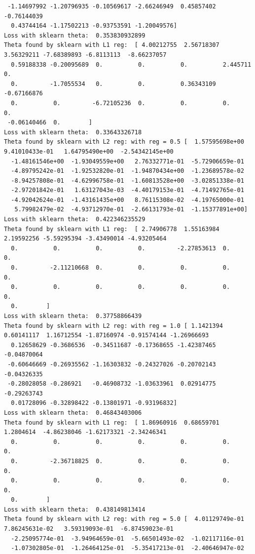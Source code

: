 \documentclass{article}
\begin{document}
\begin{tiny}
\begin{lstlisting}
 -1.14697992 -1.20796935 -0.10569617 -2.66246949  0.45857402 -0.76144039
  0.43744164 -1.17502213 -0.93753591 -1.20049576]
Loss with sklearn theta:  0.353830932899
Theta found by sklearn with L1 reg:  [ 4.00212755  2.56718307  3.56329211 -7.68389893 -6.8113113  -8.66237057
  0.59188338 -0.20095689  0.          0.          0.          2.445711    0.
  0.         -1.7055534   0.          0.          0.36343109 -0.67166876
  0.          0.         -6.72105236  0.          0.          0.          0.
 -0.06140466  0.        ]
Loss with sklearn theta:  0.33643326718
Theta found by sklearn with L2 reg: with reg = 0.5 [  1.57595698e+00   9.41010433e-01   1.64795490e+00  -2.54342145e+00
  -1.48161546e+00  -1.93049559e+00   2.76332771e-01  -5.72906659e-01
  -4.89795242e-01  -1.92532820e-01  -1.94870434e+00  -1.23689578e-02
  -8.94257808e-01  -4.62996758e-01  -1.60813528e+00  -3.02851338e-01
  -2.97201842e-01   1.63127043e-03  -4.40179153e-01  -4.71492765e-01
  -4.92042624e-01  -1.43161435e+00   8.76115308e-02  -4.19765000e-01
   5.79982479e-02  -4.93712970e-01  -2.66131793e-01  -1.15377891e+00]
Loss with sklearn theta:  0.422346235529
Theta found by sklearn with L1 reg:  [ 2.74906778  1.55163984  2.19592256 -5.59295394 -3.43490014 -4.93205464
  0.          0.          0.          0.         -2.27853613  0.          0.
  0.         -2.11210668  0.          0.          0.          0.          0.
  0.          0.          0.          0.          0.          0.          0.
  0.        ]
Loss with sklearn theta:  0.37758866439
Theta found by sklearn with L2 reg: with reg = 1.0 [ 1.1421394   0.60141117  1.16712554 -1.87160974 -0.91574144 -1.26966693
  0.12658629 -0.3686536  -0.34511687 -0.17368655 -1.42387465 -0.04870064
 -0.60646669 -0.26935562 -1.16303832 -0.24327026 -0.20702143 -0.04326335
 -0.28028058 -0.286921   -0.46908732 -1.03633961  0.02914775 -0.29263743
  0.01728096 -0.32898422 -0.13801971 -0.93196832]
Loss with sklearn theta:  0.46843403006
Theta found by sklearn with L1 reg:  [ 1.86960916  0.68659701  1.2804614  -4.86238046 -1.62173321 -2.34246341
  0.          0.          0.          0.          0.          0.          0.
  0.         -2.36718825  0.          0.          0.          0.          0.
  0.          0.          0.          0.          0.          0.          0.
  0.        ]
Loss with sklearn theta:  0.438149813414
Theta found by sklearn with L2 reg: with reg = 5.0 [  4.01129749e-01   7.86245631e-02   3.59319093e-01  -6.87459023e-01
  -2.25095774e-01  -3.94964659e-01  -5.66501493e-02  -1.02117116e-01
  -1.07302805e-01  -1.26464125e-01  -5.35417213e-01  -2.40646947e-02

\end{lstlisting}
\end{tiny}
\end{document}
